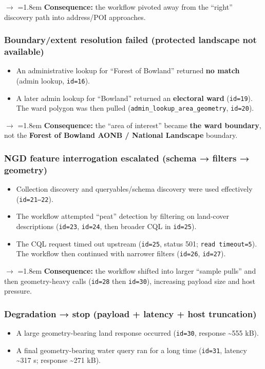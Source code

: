 \noindent$\rightarrow$ \hangindent=1.8em  \textbf{Consequence:} the workflow pivoted away from the “right” discovery path into address/POI approaches.

\subsubsection*{Boundary/extent resolution failed (protected landscape not available)}
\begin{itemize}[leftmargin=2em]
  \item An administrative lookup for “Forest of Bowland” returned \textbf{no match}
    (admin lookup, \texttt{id=16}).
  \item A later admin lookup for “Bowland” returned an \textbf{electoral ward} (\texttt{id=19}).
    The ward polygon was then pulled (\texttt{admin\_lookup\_area\_geometry}, \texttt{id=20}).
\end{itemize}

\noindent$\rightarrow$ \hangindent=1.8em  \textbf{Consequence:} the “area of interest” became \textbf{the ward boundary}, not the \textbf{Forest of Bowland AONB / National Landscape} boundary.

\subsubsection*{NGD feature interrogation escalated (schema → filters → geometry)}
\begin{itemize}[leftmargin=2em]
  \item Collection discovery and queryables/schema discovery were used effectively (\texttt{id=21--22}).
  \item The workflow attempted “peat” detection by filtering on land-cover descriptions (\texttt{id=23}, \texttt{id=24}, then broader CQL in \texttt{id=25}).
  \item The CQL request timed out upstream (\texttt{id=25}, status 501; \texttt{read timeout=5}).
    The workflow then continued with narrower filters (\texttt{id=26}, \texttt{id=27}).
\end{itemize}

\noindent$\rightarrow$ \hangindent=1.8em  \textbf{Consequence:} the workflow shifted into larger “sample pulls” and then geometry-heavy calls (\texttt{id=28} then \texttt{id=30}), increasing payload size and host pressure.

\subsubsection*{Degradation → stop (payload + latency + host truncation)}
\begin{itemize}[leftmargin=2em]
  \item A large geometry-bearing land response occurred (\texttt{id=30}, response \textasciitilde{}555 kB).
  \item A final geometry-bearing water query ran for a long time (\texttt{id=31}, latency \textasciitilde{}317 s; response \textasciitilde{}271 kB).
\end{itemize}

